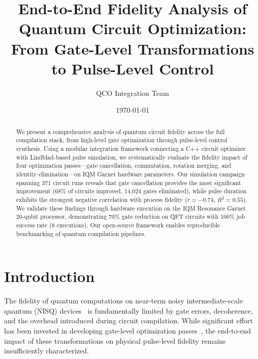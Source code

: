 \documentclass[twocolumn,showpacs,preprintnumbers,amsmath,amssymb,prb]{revtex4-2}
\begin{document}
\title{End-to-End Fidelity Analysis of Quantum Circuit Optimization:\\From Gate-Level Transformations to Pulse-Level Control}

\author{QCO Integration Team}

\date{\today}

\begin{abstract}
We present a comprehensive analysis of quantum circuit fidelity across the full compilation stack, from high-level gate optimization through pulse-level control synthesis. Using a modular integration framework connecting a C++ circuit optimizer with Lindblad-based pulse simulation, we systematically evaluate the fidelity impact of four optimization passes---gate cancellation, commutation, rotation merging, and identity elimination---on IQM Garnet hardware parameters. Our simulation campaign spanning 371 circuit runs reveals that gate cancellation provides the most significant improvement (68\% of circuits improved, 14,024 gates eliminated), while pulse duration exhibits the strongest negative correlation with process fidelity ($r = -0.74$, $R^2 = 0.55$). We validate these findings through hardware execution on the IQM Resonance Garnet 20-qubit processor, demonstrating 70\% gate reduction on QFT circuits with 100\% job success rate (8 executions). Our open-source framework enables reproducible benchmarking of quantum compilation pipelines.
\end{abstract}

\maketitle

\section{Introduction}
\label{sec:introduction}

The fidelity of quantum computations on near-term noisy intermediate-scale quantum (NISQ) devices~\cite{preskill2018quantum} is fundamentally limited by gate errors, decoherence, and the overhead introduced during circuit compilation. While significant effort has been invested in developing gate-level optimization passes~\cite{nam2018automated,kissinger2020reducing}, the end-to-end impact of these transformations on physical pulse-level fidelity remains insufficiently characterized.
\end{document}
